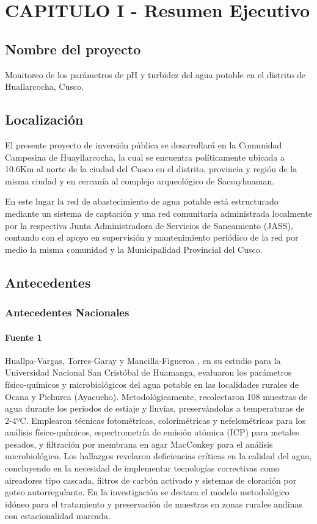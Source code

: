 \chapter{CAPITULO I - Resumen Ejecutivo}

\section{Nombre del proyecto}

Monitoreo de los parámetros de pH y turbidez del agua potable en el distrito de Huallarcocha, Cusco.

\section{Localización}

El presente proyecto de inversión pública se desarrollará en la Comunidad Campesina de Huayllarcocha, la cual se encuentra políticamente ubicada a 10.6Km al norte de la ciudad del Cusco en el distrito, provincia y región de la misma ciudad y en cercanía al complejo arqueológico de Sacsayhuaman.

En este lugar la red de abastecimiento de agua potable está estructurado mediante un sistema de captación y una red comunitaria administrada localmente por la respectiva Junta Administradora de Servicios de Saneamiento (JASS), contando con el apoyo en supervisión y mantenimiento periódico de la red por medio la misma comunidad y la Municipalidad Provincial del Cusco.

\section{Antecedentes}

\subsection{Antecedentes Nacionales}

\subsubsection{Fuente 1}

Huallpa-Vargas, Torres-Garay y Mancilla-Figueroa \cite{aguapotable2025}, en su estudio para la Universidad Nacional San Cristóbal de Huamanga, evaluaron los parámetros físico-químicos y microbiológicos del agua potable en las localidades rurales de Ocana y Pichurca (Ayacucho). Metodológicamente, recolectaron 108 muestras de agua durante los periodos de estiaje y lluvias, preservándolas a temperaturas de 2-4ºC. Emplearon técnicas fotométricas, colorimétricas y nefelométricas para los análisis físico-químicos, espectrometría de emisión atómica (ICP) para metales pesados, y filtración por membrana en agar MacConkey para el análisis microbiológico. Los hallazgos revelaron deficiencias críticas en la calidad del agua, concluyendo en la necesidad de implementar tecnologías correctivas como aireadores tipo cascada, filtros de carbón activado y sistemas de cloración por goteo autorregulante. En la investigación se destaca el modelo metodológico idóneo para el tratamiento y preservación de muestras en zonas rurales andinas con estacionalidad marcada.

